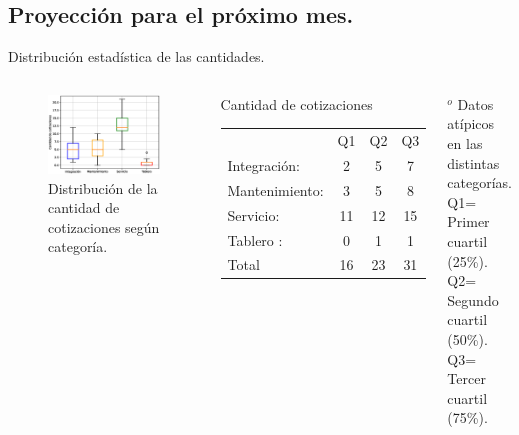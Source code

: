 \documentclass[aspectratio=169,xcolor=dvipsnames]{beamer}
\begin{document}
\subsection{Proyección para el próximo mes.}

 \begin{frame}{Distribución estadística de las cantidades.}
 \begin{columns}[c]
 \begin{figure}
     \includegraphics[width=\textwidth]{EPS/boxplot.eps}
     \caption{Distribución de la cantidad de cotizaciones según categoría.}
     \label{box_plot1}
\end{figure}
\begin{block}{Cantidad de cotizaciones}
     \begin{tabular}{lccc}
                    &Q1&Q2&Q3\\
          Integración:&2 & 5& 7 \\
          Mantenimiento:&3& 5&8\\
          Servicio:& 11&12 &15\\
          Tablero :& 0& 1&1\\ \hline
          Total & 16 & 23&31\\
     \end{tabular}
\end{block}
 \begin{block}{}
    \scriptsize{$^{o}$ Datos atípicos en las distintas categorías.\\
    Q1= Primer cuartil (25\%).\\
    Q2= Segundo cuartil (50\%).\\
    Q3= Tercer cuartil (75\%).}
    
\end{block}
 \end{columns}
\end{frame}
\end{document}

